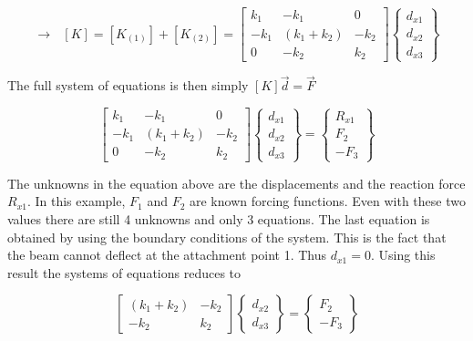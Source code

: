 \begin{enumerate}
    \begin{equation}
      \to ~~~
          [K] = \left[K_{(1)}\right] + \left[K_{(2)}\right] =
          \left[ \begin{array}{ccc}
              k_1  &-k_1        & 0   \\
              -k_1  & (k_1+k_2)  &-k_2 \\
              0    &-k_2        & k_2
            \end{array} \right]
          \begin{Bmatrix}
            d_{x1} \\ d_{x2} \\ d_{x3}
          \end{Bmatrix}
    \end{equation}
    
    The full system of equations is then simply $[K]\vec{d} = \vec{F}$

    \begin{equation}
    \left[ \begin{array}{ccc}
        k_1  &-k_1        & 0   \\
        -k_1  & (k_1+k_2)  &-k_2 \\
        0    &-k_2        & k_2
      \end{array} \right]
    \begin{Bmatrix}
      d_{x1} \\ d_{x2} \\ d_{x3}
    \end{Bmatrix} = \begin{Bmatrix} R_{x1} \\ F_2
      \\ -F_3 \end{Bmatrix}
    \end{equation}

    The unknowns in the equation above are the displacements and the
    reaction force $R_{x1}$. In this example, $F_1$ and $F_2$ are
    known forcing functions. Even with these two values there are
    still 4 unknowns and only 3 equations. The last equation is
    obtained by using the boundary conditions of the system. This is
    the fact that the beam cannot deflect at the attachment point
    1. Thus $d_{x1} = 0$. Using this result the systems of equations
    reduces to 

    \begin{equation}
      \left[ \begin{array}{cc}
          (k_1+k_2)  &-k_2 \\
          -k_2       & k_2
        \end{array} \right]
      \left\{ \begin{array}{c}
        d_{x2}  \\ d_{x3}
      \end{array} \right\} =
      \left\{ \begin{array}{r}
        F_2  \\ -F_3
      \end{array} \right\}
    \end{equation}


\end{enumerate}
